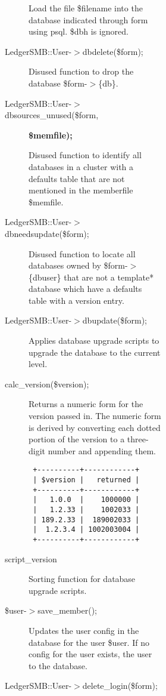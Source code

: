 \begin{description}
\begin{description}
\begin{description}
\begin{description}
\begin{description}
\begin{description}
\begin{description}
Load the file \$filename into the database indicated through form using psql.
\$dbh is ignored.


\item[{LedgerSMB::User-$>$dbdelete(\$form);}] \mbox{}

Disused function to drop the database \$form-$>$\{db\}.


\item[{LedgerSMB::User-$>$dbsources\_unused(\$form,}] \textbf{\$memfile);}

Disused function to identify all databases in a cluster with a defaults table
that are not mentioned in the memberfile \$memfile.


\item[{LedgerSMB::User-$>$dbneedsupdate(\$form);}] \mbox{}

Disused function to locate all databases owned by \$form-$>$\{dbuser\} that are not
a template* database which have a defaults table with a version entry.


\item[{LedgerSMB::User-$>$dbupdate(\$form);}] \mbox{}

Applies database upgrade scripts to upgrade the database to the current level.


\item[{calc\_version(\$version);}] \mbox{}

Returns a numeric form for the version passed in.  The numeric form is derived
by converting each dotted portion of the version to a three-digit number and
appending them.

\begin{verbatim}
 +----------+------------+
 | $version |   returned |
 +----------+------------+
 |   1.0.0  |    1000000 |
 |   1.2.33 |    1002033 |
 | 189.2.33 |  189002033 |
 |  1.2.3.4 | 1002003004 |
 +----------+------------+
\end{verbatim}

\item[{script\_version}] \mbox{}

Sorting function for database upgrade scripts.


\item[{\$user-$>$save\_member();}] \mbox{}

Updates the user config in the database for the user \$user.  If no config for
the user exists, the user to the database.


\item[{LedgerSMB::User-$>$delete\_login(\$form);}] \mbox{}


\end{description}
\end{description}
\end{description}
\end{description}
\end{description}
\end{description}
\end{description}
